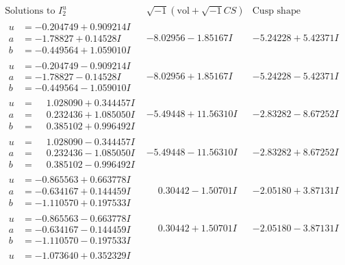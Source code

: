 \documentclass[1p]{elsarticle_modified}
\theoremstyle{definition}
\newcommand{\I}{\sqrt{-1}}
\begin{document}
$$\begin{array}{c|c|c}  
\text{Solutions to }I^u_{2}& \I (\text{vol} + \sqrt{-1}CS) & \text{Cusp shape}\\
 \hline 
\begin{aligned}
u &= -0.204749 + 0.909214 I \\
a &= -1.78827 + 0.14528 I \\
b &= -0.449564 + 1.059010 I\end{aligned}
 & -8.02956 - 1.85167 I & -5.24228 + 5.42371 I \\ \hline\begin{aligned}
u &= -0.204749 - 0.909214 I \\
a &= -1.78827 - 0.14528 I \\
b &= -0.449564 - 1.059010 I\end{aligned}
 & -8.02956 + 1.85167 I & -5.24228 - 5.42371 I \\ \hline\begin{aligned}
u &= \phantom{-}1.028090 + 0.344457 I \\
a &= \phantom{-}0.232436 + 1.085050 I \\
b &= \phantom{-}0.385102 + 0.996492 I\end{aligned}
 & -5.49448 + 11.56310 I & -2.83282 - 8.67252 I \\ \hline\begin{aligned}
u &= \phantom{-}1.028090 - 0.344457 I \\
a &= \phantom{-}0.232436 - 1.085050 I \\
b &= \phantom{-}0.385102 - 0.996492 I\end{aligned}
 & -5.49448 - 11.56310 I & -2.83282 + 8.67252 I \\ \hline\begin{aligned}
u &= -0.865563 + 0.663778 I \\
a &= -0.634167 + 0.144459 I \\
b &= -1.110570 + 0.197533 I\end{aligned}
 & \phantom{-}0.30442 - 1.50701 I & -2.05180 + 3.87131 I \\ \hline\begin{aligned}
u &= -0.865563 - 0.663778 I \\
a &= -0.634167 - 0.144459 I \\
b &= -1.110570 - 0.197533 I\end{aligned}
 & \phantom{-}0.30442 + 1.50701 I & -2.05180 - 3.87131 I \\ \hline\begin{aligned}
u &= -1.073640 + 0.352329 I \\

\end{aligned}
\end{array}$$
\end{document}

